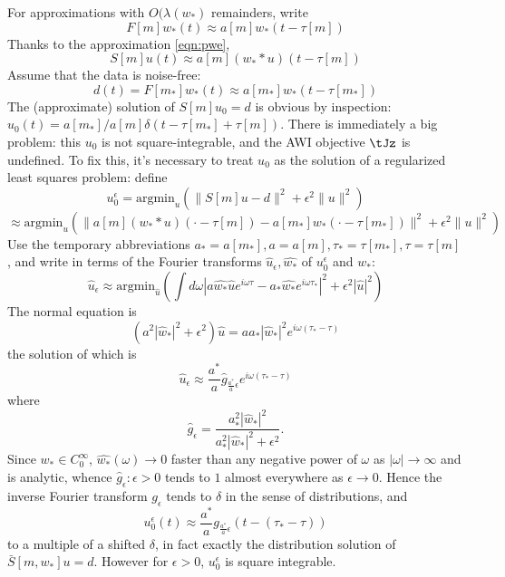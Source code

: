 For approximations with $O(\lambda(w_*)$ remainders, write
\begin{equation}
  \label{eqn:pwe}
  F[m]w_*(t) \approx a[m]w_*(t-\tau[m])
\end{equation}
Thanks to the approximation \ref{eqn:pwe},
\begin{equation}
  \label{eqn:spwe}
S[m]u(t) \approx a[m](w_**u)(t-\tau[m])
\end{equation}
Assume that the data is noise-free:
$$
d(t)=F[m_*]w_*(t) \approx a[m_*]w_*(t-\tau[m_*])
$$
The (approximate) solution of $S[m]u_0=d$ is obvious by inspection: $u_0(t) = a[m_*]/a[m]\delta(t-\tau[m_*]+\tau[m])$. There is immediately a big problem: this $u_0$ is not square-integrable, and the AWI objective $\tJz$ is undefined. To fix this, it's necessary to treat $u_0$ as the solution of a regularized least squares problem: define
$$
u_0^{\epsilon} = \mbox{argmin}_u (\|S[m]u-d\|^2 + \epsilon^2\|u\|^2)
$$
$$
\approx \mbox{argmin}_u (\|a[m](w_**u)(\cdot-\tau[m])-a[m_*]w_*(\cdot-\tau[m_*])\|^2 + \epsilon^2\|u\|^2)
$$
Use the temporary abbreviations $a_*=a[m_*], a=a[m], \tau_*=\tau[m_*], \tau=\tau[m]$, and write in terms of the Fourier transforms $\hat{u}_{\epsilon},\hat{w_*}$ of $u_0^{\epsilon}$ and $w_*$:
$$
\hat{u}_{\epsilon} \approx \mbox{argmin}_{\hat{u}}\left(\int d\omega |a\hat{w_*}\hat{u}e^{i\omega \tau}-a_*\hat{w_*}e^{i\omega\tau_*}|^2 + \epsilon^2 |\hat{u}|^2\right)
$$
The normal equation is
$$
(a^2 |\hat{w}_*|^2 +\epsilon^2)\hat{u} = a a_*|\hat{w}_*|^2e^{i\omega(\tau_*-\tau)}
$$
the solution of which is
$$
\hat{u}_{\epsilon} \approx \frac{a^*}{a}\hat{g}_{\frac{a^*}{a}\epsilon} e^{i\omega(\tau_*-\tau)}
$$
where
$$ 
\hat{g}_{\epsilon} = \frac{a_*^2|\hat{w}_*|^2}{a_*^2|\hat{w}_*|^2 + \epsilon^2}.
$$
Since $w_* \in C_0^{\infty}$, $\hat{w_*}(\omega) \rightarrow 0$ faster than any negative power of $\omega$ as $|\omega| \rightarrow \infty$ and is analytic, whence $\hat{g}_{\epsilon}: \epsilon > 0$ tends to $1$ almost everywhere as $\epsilon \rightarrow 0$. Hence the inverse Fourier transform $g_{\epsilon}$ tends to $\delta$ in the sense of distributions, and 
$$
u_0^{\epsilon}(t) \approx \frac{a^*}{a}g_{\frac{a^*}{a}\epsilon}(t-(\tau_*-\tau))
$$
to a multiple of a shifted $\delta$, in fact exactly the distribution solution of $\bar{S}[m,w_*]u=d$. However for $\epsilon>0$, $u_0^{\epsilon}$ is square integrable.


